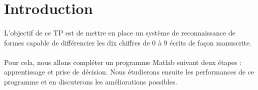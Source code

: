 \section{Introduction}

\paragraph{}
L'objectif de ce TP est de mettre en place un système de reconnaissance de formes capable de différencier les dix chiffres de 0 à 9 écrits de façon manuscrite. 

\paragraph{}
Pour cela, nous allons compléter un programme Matlab suivant deux étapes : apprentissage et prise de décision. Nous étudierons ensuite les performances de ce 
programme et en discuterons les améliorations possibles. 
